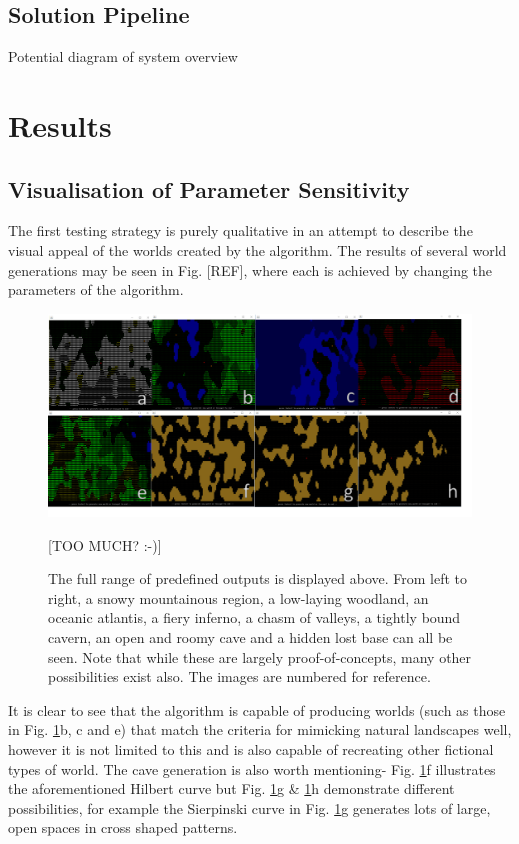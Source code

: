 \documentclass[12pt,a4paper]{article}
\begin{document}
\subsection{Solution Pipeline}
Potential diagram of system overview

\section{Results}\label{results}


\subsection{Visualisation of Parameter Sensitivity}

The first testing strategy is purely qualitative in an attempt to describe the visual appeal of the worlds created by the algorithm. The results of several world generations may be seen in Fig. [REF], where each is achieved by changing the parameters of the algorithm. 

\begin{figure}
  \centering
 	\includegraphics[width=0.8\linewidth]{images/collaboration.png}
	\caption[]{The full range of predefined outputs is displayed above. From left to right, a snowy mountainous region, a low-laying woodland, an oceanic atlantis, a fiery inferno, a chasm of valleys, a tightly bound cavern, an open and roomy cave and a hidden lost base can all be seen. Note that while these are largely proof-of-concepts, many other possibilities exist also. The images are numbered for reference.} [TOO MUCH? :-)]
	\label{fig:7}
\end{figure} 

It is clear to see that the algorithm is capable of producing worlds (such as those in Fig. \ref{fig:7}b, c and e) that match the criteria for mimicking natural landscapes well, however it is not limited to this and is also capable of recreating other fictional types of world. The cave generation is also worth mentioning- Fig. \ref{fig:7}f illustrates the aforementioned Hilbert curve but Fig. \ref{fig:7}g \& \ref{fig:7}h demonstrate different possibilities, for example the Sierpinski curve in Fig. \ref{fig:7}g generates lots of large, open spaces in cross shaped patterns. 
\end{document}
